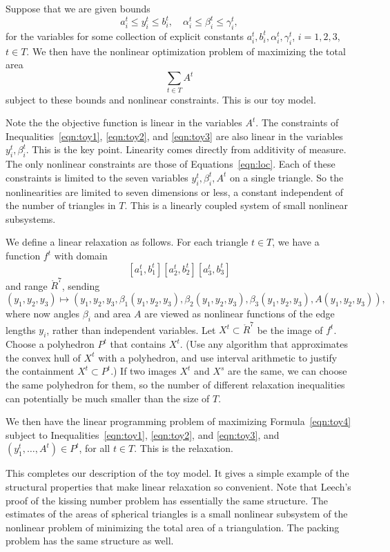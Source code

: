 Suppose that we are given bounds
   \begin{equation}\label{eqn:toy3}
   a_i^t \le y_i^t \le b_i^t,\quad \alpha_i^t \le \beta_i^t \le \gamma_i^t,
   \end{equation}
for the variables for some collection of explicit constants $a_i^t,b_i^t,\alpha_i^t,\gamma_i^t$,
$i=1,2,3$, $t\in T$.  We then have the nonlinear optimization problem of maximizing the total area
   \begin{equation}\label{eqn:toy4}
   \sum_{t\in T} A^t
   \end{equation}
subject to these bounds and  nonlinear constraints.  This is our toy model.

Note the the objective function is linear in the variables $A^t$.  The constraints
of Inequalities~\ref{eqn:toy1}, \ref{eqn:toy2}, and \ref{eqn:toy3} are also linear in
the variables $y^t_i,\beta^t_i$.  This is the key point.  Linearity comes directly
from additivity of measure.
The only nonlinear constraints are those of 
Equations~\ref{eqn:loc}.  Each of these constraints is limited to the seven variables
$y_i^t,\beta_i^t,A^t$ on  a single triangle.  So the nonlinearities are limited to seven
dimensions or less, a constant independent of the number of triangles in $T$.  This is a linearly
coupled system of small nonlinear subsystems.

We define a linear relaxation as follows.  For each triangle $t\in T$, we have a function
$f^t$ with domain
  $$
   [a^t_1,b^t_1][a^t_2,b^t_2][a^t_3,b^t_3]
  $$
and range $\ring{R}^7$, sending
  $$
  (y_1,y_2,y_3)\mapsto (y_1,y_2,y_3,\beta_1(y_1,y_2,y_3),\beta_2(y_1,y_2,y_3),\beta_3(y_1,y_2,y_3),
       A(y_1,y_2,y_3)),
  $$
where now angles $\beta_i$ and area $A$ are viewed as nonlinear functions of the edge lengths $y_i$,
rather than independent variables.
Let $X^t\subset\ring{R}^7$ be the image of $f^t$.
Choose a polyhedron $P^t$ that contains $X^t$.  (Use any algorithm that approximates the
convex hull of $X^t$ with a polyhedron, and use interval arithmetic to justify the containment
$X^t\subset P^t$.)   If two images $X^t$ and $X^s$ are the same, 
we can choose the same polyhedron for them, so the number of different relaxation inequalities
can potentially be much smaller than the size of $T$.

We then have the linear programming problem
of maximizing Formula~\ref{eqn:toy4} subject to 
Inequalities~\ref{eqn:toy1}, \ref{eqn:toy2}, and \ref{eqn:toy3}, 
and $(y^t_1,\ldots,A^t)\in P^t$, for all $t\in T$.  This is the relaxation.

This completes our description of the toy model.  It gives a simple example of the
structural properties that make linear relaxation so convenient.
Note that Leech's proof of the kissing number problem has essentially the same
structure.  The estimates of the areas of spherical triangles is a small nonlinear subsystem
of the nonlinear problem of minimizing the total area of a triangulation.
The packing problem has the same structure as well.





\clearpage







\clearpage
